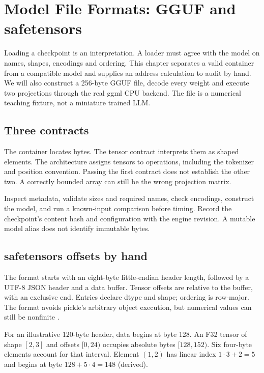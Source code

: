 \chapter{Model File Formats: GGUF and safetensors}\label{app:formats}
\begin{ChapterIntent}
Loading a checkpoint is an interpretation. A loader must agree with the
model on names, shapes, encodings and ordering. This chapter separates a
valid container from a compatible model and supplies an address calculation
to audit by hand. We will also construct a 256-byte GGUF file, decode every
weight and execute two projections through the real ggml CPU backend.
The file is a numerical teaching fixture, not a miniature trained LLM.
\end{ChapterIntent}

\section{Three contracts}
The container locates bytes. The tensor contract interprets them as shaped
elements. The architecture assigns tensors to operations, including the
tokenizer and position convention. Passing the first contract does not
establish the other two. A correctly bounded array can still be the wrong
projection matrix.

Inspect metadata, validate sizes and required names, check encodings,
construct the model, and run a known-input comparison before timing.
Record the checkpoint's content hash and configuration with the engine
revision. A mutable model alias does not identify immutable bytes.

\section{safetensors offsets by hand}
The format starts with an eight-byte little-endian header length, followed
by a UTF-8 JSON header and a data buffer. Tensor offsets are relative to
the buffer, with an exclusive end. Entries declare dtype and shape;
ordering is row-major. The format avoids pickle's arbitrary object
execution, but numerical values can still be nonfinite
\cite{safetensors2026format}.

For an illustrative 120-byte header, data begins at byte 128.
An F32 tensor of shape $[2,3]$ and offsets $[0,24)$ occupies absolute
bytes $[128,152)$. Six four-byte elements account for that interval.
Element $(1,2)$ has linear index $1\cdot3+2=5$ and begins at byte
$128+5\cdot4=148$ (derived).

